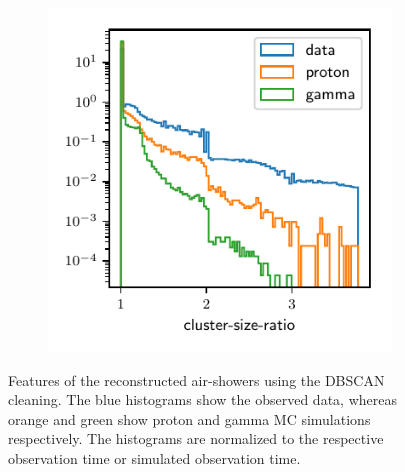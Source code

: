\begin{figure}
\begin{subfigure}{0.5\textwidth}
  \end{subfigure}
  \begin{subfigure}{0.5\textwidth}
    \centering
    \includegraphics[width=\textwidth, page=8]{Plots/data_mc/features_DBSCAN.pdf}
  \end{subfigure}
  \caption{Features of the reconstructed air-showers using the DBSCAN cleaning. The blue histograms show the observed data, whereas orange and green show proton and gamma MC simulations respectively. The histograms are normalized to the respective observation time or simulated observation time.}
  \label{fig:feat_dbscan}
\end{figure}
%
%
